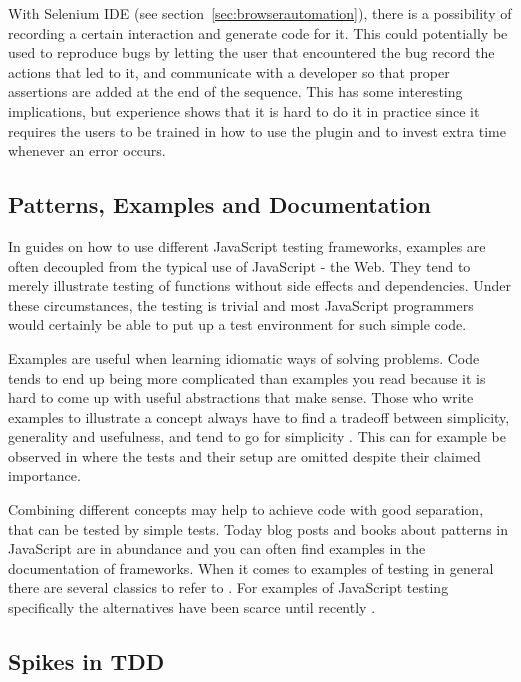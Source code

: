 \documentclass[11pt]{article}
\begin{document}
With Selenium IDE (see section~\ref{sec:browserautomation}), there is a possibility of recording a certain interaction and generate code for it. This could potentially be used to reproduce bugs by letting the user that encountered the bug record the actions that led to it, and communicate with a developer so that proper assertions are added at the end of the sequence. This has some interesting implications, but experience shows that it is hard to do it in practice since it requires the users to be trained in how to use the plugin and to invest extra time whenever an error occurs. \cite[questions~42-43]{Edelstam}

\subsection{Patterns, Examples and Documentation}
\label{sec:patternsexamples}

In guides on how to use different JavaScript testing frameworks, examples are often decoupled from the typical use of JavaScript - the Web. They tend to merely illustrate testing of functions without side effects and dependencies. Under these circumstances, the testing is trivial and most JavaScript programmers would certainly be able to put up a test environment for such simple code.

Examples are useful when learning idiomatic ways of solving problems. Code tends to end up being more complicated than examples you read because it is hard to come up with useful abstractions that make sense. Those who write examples to illustrate a concept always have to find a tradeoff between simplicity, generality and usefulness, and tend to go for simplicity \cite[questions~56-57]{Edelstam}. This can for example be observed in \cite[p.~13-45]{Refactoring} where the tests and their setup are omitted despite their claimed importance.

Combining different concepts may help to achieve code with good separation, that can be tested by simple tests. Today blog posts and books about patterns in JavaScript are in abundance and you can often find examples in the documentation of frameworks. When it comes to examples of testing in general there are several classics to refer to \cite{KentBeck}\cite{TestPatterns}. For examples of JavaScript testing specifically the alternatives have been scarce until recently \cite{Tddjs}\cite{BDDJS}\cite{TestableJS}\cite{JasmineBook}.

\subsection{Spikes in TDD}
\end{document}
